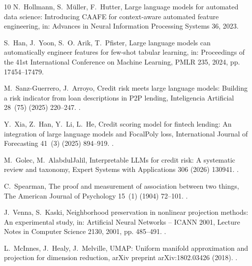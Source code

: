 \documentclass[preprint,12pt]{elsarticle}
\begin{document}
\begin{thebibliography}{10}
N.~Hollmann, S.~M{\"u}ller, F.~Hutter, Large language models for automated data
  science: Introducing {CAAFE} for context-aware automated feature engineering,
  in: Advances in Neural Information Processing Systems 36, 2023.

S.~Han, J.~Yoon, S.~O. Arik, T.~Pfister, Large language models can
  automatically engineer features for few-shot tabular learning, in:
  Proceedings of the 41st International Conference on Machine Learning, PMLR
  235, 2024, pp. 17454--17479.

M.~Sanz-Guerrero, J.~Arroyo, Credit risk meets large language models: Building
  a risk indicator from loan descriptions in {P2P} lending, Inteligencia
  Artificial 28~(75) (2025) 220--247.
\newblock \href {https://doi.org/10.4114/intartif.vol28iss75pp220-247}
  {}.

Y.~Xia, Z.~Han, Y.~Li, L.~He, Credit scoring model for fintech lending: An
  integration of large language models and {FocalPoly} loss, International
  Journal of Forecasting 41~(3) (2025) 894--919.
\newblock \href {https://doi.org/10.1016/j.ijforecast.2024.07.005}
  {}.

M.~Golec, M.~AlabdulJalil, Interpretable {LLMs} for credit risk: A systematic
  review and taxonomy, Expert Systems with Applications 306 (2026) 130941.
\newblock \href {https://doi.org/10.1016/j.eswa.2025.130941}
  {}.

C.~Spearman, The proof and measurement of association between two things, The
  American Journal of Psychology 15~(1) (1904) 72--101.
\newblock \href {https://doi.org/10.2307/1412159} {}.

J.~Venna, S.~Kaski, Neighborhood preservation in nonlinear projection methods:
  An experimental study, in: Artificial Neural Networks -- ICANN 2001, Lecture
  Notes in Computer Science 2130, 2001, pp. 485--491.
\newblock \href {https://doi.org/10.1007/3-540-44668-0_68}
  {}.

L.~McInnes, J.~Healy, J.~Melville, {UMAP}: Uniform manifold approximation and
  projection for dimension reduction, arXiv preprint arXiv:1802.03426 (2018).
\newblock \href {https://doi.org/10.48550/arXiv.1802.03426}
  {}.


\end{thebibliography}
\end{document}
